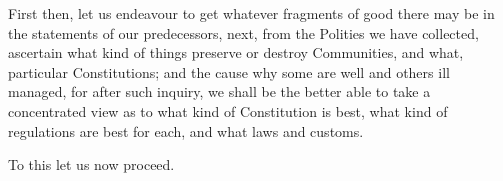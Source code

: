 First then, let us endeavour to get whatever fragments of good there may
be in the statements of our predecessors, next, from the Polities we
have collected, ascertain what kind of things preserve or destroy
Communities, and what, particular Constitutions; and the cause why some
are well and others ill managed, for after such inquiry, we shall be the
better able to take a concentrated view as to what kind of Constitution
is best, what kind of regulations are best for each, and what laws and
customs.

To this let us now proceed.


